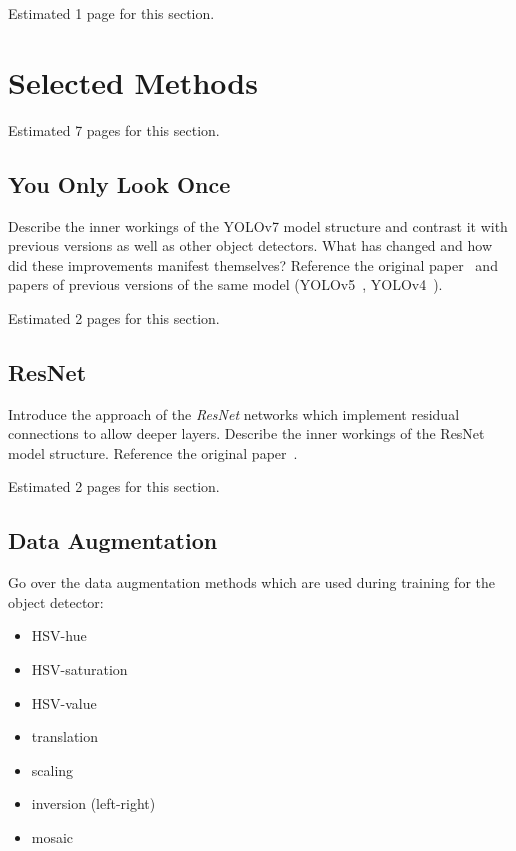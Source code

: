 \documentclass[draft,final]{vutinfth} %
\begin{document}
Estimated 1 page for this section.

\section{Selected Methods}
\label{sec:selected-methods}

Estimated 7 pages for this section.

\subsection{You Only Look Once}
\label{sec:methods-detection}

Describe the inner workings of the YOLOv7 model structure and contrast
it with previous versions as well as other object detectors. What has
changed and how did these improvements manifest themselves? Reference
the original paper~\cite{wang2022} and papers of previous versions of
the same model (YOLOv5~\cite{jocher2022},
YOLOv4~\cite{bochkovskiy2020}).

Estimated 2 pages for this section.

\subsection{ResNet}
\label{sec:methods-classification}

Introduce the approach of the \emph{ResNet} networks which implement
residual connections to allow deeper layers. Describe the inner
workings of the ResNet model structure. Reference the original
paper~\cite{he2016}.

Estimated 2 pages for this section.

\subsection{Data Augmentation}
\label{sec:methods-augmentation}

Go over the data augmentation methods which are used during training
for the object detector:
\begin{itemize}
\item HSV-hue
\item HSV-saturation
\item HSV-value
\item translation
\item scaling
\item inversion (left-right)
\item mosaic
\end{itemize}
\end{document}
